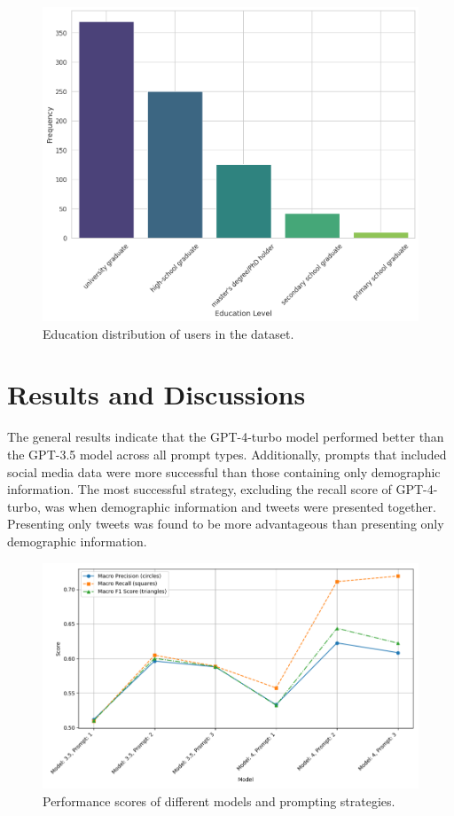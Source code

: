 \documentclass[sigconf,natbib=false]{acmart}
\begin{document}
\begin{figure}[ht]
  \centering
  \includegraphics[width=\linewidth]{education.png}
  \caption{Education distribution of users in the dataset.}
  \label{fig:age_distribution}
\end{figure}


\section{Results and Discussions}
The general results indicate that the GPT-4-turbo model performed better than the GPT-3.5 model across all prompt types. Additionally, prompts that included social media data were more successful than those containing only demographic information. The most successful strategy, excluding the recall score of GPT-4-turbo, was when demographic information and tweets were presented together. Presenting only tweets was found to be more advantageous than presenting only demographic information.

\begin{figure}[ht]
  \centering
  \includegraphics[width=\linewidth]{graph1.png}
  \caption{Performance scores of different models and prompting strategies.}
  \label{fig:graph1}
\end{figure}
\end{document}
